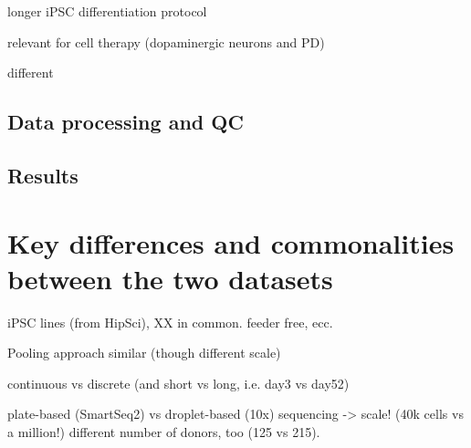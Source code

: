 longer iPSC differentiation protocol

relevant for cell therapy (dopaminergic neurons and PD)

different 

\subsection{Data processing and QC}

\subsection{Results}


\section{Key differences and commonalities between the two datasets}

iPSC lines (from HipSci), XX in common.
feeder free, ecc.

Pooling approach similar (though different scale)

continuous vs discrete (and short vs long, i.e. day3 vs day52)

plate-based (SmartSeq2) vs droplet-based (10x) sequencing
-> scale! (40k cells vs a million!)
different number of donors, too (125 vs 215).



